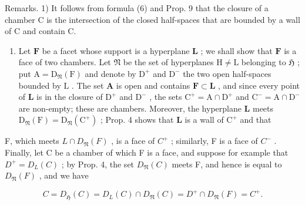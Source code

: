 Remarks. 1) It follows from formula (6) and Prop. 9 that the closure of a chamber C is the intersection of the closed half-spaces that are bounded by a wall of C and contain C.

\begin{enumerate}
\def\labelenumi{\arabic{enumi})}
\setcounter{enumi}{1}
\tightlist
\item
  Let \(\mathbf{F}\) be a facet whose support is a hyperplane \(\mathbf{L}\) ; we shall show that \(\mathbf{F}\) is a face of two chambers. Let \(\mathfrak{N}\) be the set of hyperplanes \(\mathrm{H} \neq \mathrm{L}\) belonging to \(\mathfrak{H}\) ; put \(\mathrm{A} = \mathrm{D}_{\mathfrak{N}}(\mathrm{F})\) and denote by \(\mathrm{D}^{+}\) and \(\mathrm{D}^{-}\) the two open half-spaces bounded by \(\mathrm{L}\) . The set \(\mathbf{A}\) is open and contains \(\mathbf{F} \subset \mathbf{L}\) , and since every point of \(\mathbf{L}\) is in the closure of \(\mathrm{D}^{+}\) and \(\mathrm{D}^{-}\) , the sets \(\mathrm{C}^{+} = \mathrm{A} \cap \mathrm{D}^{+}\) and \(\mathrm{C}^{-} = \mathrm{A} \cap \mathrm{D}^{-}\) are non-empty; these are chambers. Moreover, the hyperplane \(\mathbf{L}\) meets \(\mathrm{D}_{\mathfrak{N}}(\mathrm{F}) = \mathrm{D}_{\mathfrak{N}}(\mathrm{C}^{+})\) ; Prop. 4 shows that \(\mathbf{L}\) is a wall of \(\mathrm{C}^{+}\) and that
\end{enumerate}

F, which meets \(L \cap D_{\mathfrak{N}}(F)\) , is a face of \(C^{+}\) ; similarly, F is a face of \(C^{-}\) . Finally, let C be a chamber of which F is a face, and suppose for example that \(D^{+} = D_{L}(C)\) ; by Prop. 4, the set \(D_{\mathfrak{N}}(C)\) meets F, and hence is equal to \(D_{\mathfrak{N}}(F)\) , and we have

\[
C = D _ {\mathfrak {H}} (C) = D _ {L} (C) \cap D _ {\mathfrak {N}} (C) = D ^ {+} \cap D _ {\mathfrak {N}} (F) = C ^ {+}.
\]


